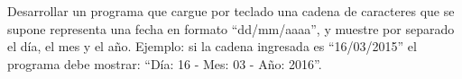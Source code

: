 Desarrollar un programa que cargue por teclado una cadena de caracteres que se supone representa una fecha en formato ``dd/mm/aaaa'', y muestre por separado el día, el mes y el año. Ejemplo: si la cadena ingresada es ``16/03/2015'' el programa debe mostrar: ``Día: 16  -  Mes: 03  -  Año: 2016''.
